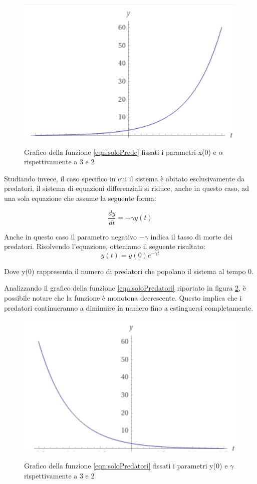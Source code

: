 \documentclass[11pt]{article}
\begin{document}
\begin{figure}[h]
    \centering
    \includegraphics[scale = 1]{plotSoloPrede.PNG}
    \label{figPlotLotkaVolterraSoloPrede}
    \caption{Grafico della funzione \eqref{eqn:soloPrede} fissati i parametri x(0) e $\alpha$ rispettivamente a 3 e 2}
\end{figure}

\noindent Studiando invece, il caso specifico in cui il sistema è abitato esclusivamente da predatori, il sistema di equazioni differenziali si riduce, anche in questo caso, ad una sola equazione che assume la seguente forma: 

\[
    \frac{dy}{dt} = -\gamma y(t) 
\]

Anche in questo caso il parametro negativo $-\gamma$ indica il tasso di morte dei predatori. 
Risolvendo l'equazione, otteniamo il seguente risultato:
\begin{equation}\label{eqn:soloPredatori}
    y(t) = y(0)e^{-\gamma t}
\end{equation}

\noindent Dove y(0) rappresenta il numero di predatori che popolano il sistema al tempo 0.

\noindent Analizzando il grafico della funzione \eqref{eqn:soloPredatori} riportato in figura \ref{figPlotLotkaVolterraSoloPredatori}, è possibile notare che la funzione è monotona decrescente. Questo implica che i predatori continueranno a diminuire in numero fino a estinguersi completamente. 

\begin{figure}[h]
    \centering
    \includegraphics[scale = 1]{plotSoloPredatori.PNG}
    \label{figPlotLotkaVolterraSoloPredatori}
    \caption{Grafico della funzione \eqref{eqn:soloPredatori} fissati i parametri y(0) e $\gamma$ rispettivamente a 3 e 2}
\end{figure}
\end{document}
